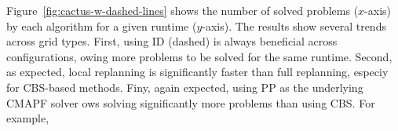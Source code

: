 \documentclass[letterpaper]{article} %
\def\
UrlFont{\rm}  %
\theoremstyle{definition}
\begin{document}


Figure~\ref{fig:cactus-w-dashed-lines} shows the number of solved problems  ($x$-axis) by each algorithm for a given runtime ($y$-axis).
The results show several trends across  grid types.
First, using ID (dashed) is always beneficial across  configurations, owing more problems to be solved for the same runtime. Second, as expected, local replanning is significantly faster than full replanning, especiy for CBS-based methods.  Finy, again expected, using PP as the underlying CMAPF solver ows solving significantly more problems than using CBS. For example,    
\end{document}
